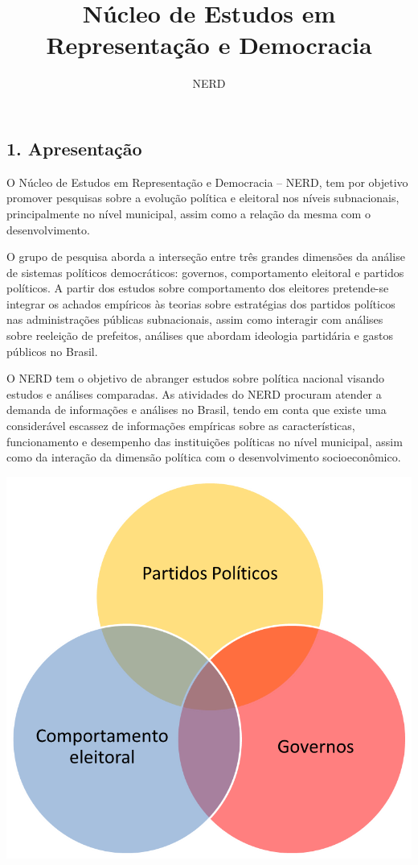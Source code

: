 \documentclass[
  12pt,
]{article}
\title{Núcleo de Estudos em Representação e Democracia}
\subtitle{NERD}
\author{}
\date{\vspace{-2.5em}}
\begin{document}
\maketitle

\hypertarget{apresentauxe7uxe3o}{%
\subsection{1. Apresentação}\label{apresentauxe7uxe3o}}

\hfill\break O Núcleo de Estudos em Representação e Democracia -- NERD,
tem por objetivo promover pesquisas sobre a evolução política e
eleitoral nos níveis subnacionais, principalmente no nível municipal,
assim como a relação da mesma com o desenvolvimento.

O grupo de pesquisa aborda a interseção entre três grandes dimensões da
análise de sistemas políticos democráticos: governos, comportamento
eleitoral e partidos políticos. A partir dos estudos sobre comportamento
dos eleitores pretende-se integrar os achados empíricos às teorias sobre
estratégias dos partidos políticos nas administrações públicas
subnacionais, assim como interagir com análises sobre reeleição de
prefeitos, análises que abordam ideologia partidária e gastos públicos
no Brasil.

O NERD tem o objetivo de abranger estudos sobre política nacional
visando estudos e análises comparadas. As atividades do NERD procuram
atender a demanda de informações e análises no Brasil, tendo em conta
que existe uma considerável escassez de informações empíricas sobre as
características, funcionamento e desempenho das instituições políticas
no nível municipal, assim como da interação da dimensão política com o
desenvolvimento socioeconômico.

\includegraphics{nerd_diagrama_venn.png}
\end{document}
